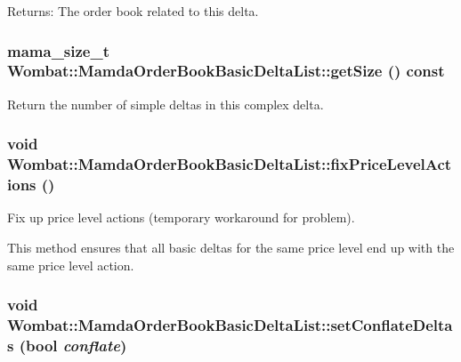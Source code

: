\begin{Desc}
\item[Returns:]The order book related to this delta. \end{Desc}
\hypertarget{classWombat_1_1MamdaOrderBookBasicDeltaList_1fe708dd0e109903a4ab216e390b74ec}{
\subsubsection[getSize]{\setlength{\rightskip}{0pt plus 5cm}mama\_\-size\_\-t Wombat::Mamda\-Order\-Book\-Basic\-Delta\-List::get\-Size () const}}
\label{classWombat_1_1MamdaOrderBookBasicDeltaList_1fe708dd0e109903a4ab216e390b74ec}


Return the number of simple deltas in this complex delta. 

\hypertarget{classWombat_1_1MamdaOrderBookBasicDeltaList_04e7cdfa64d6a7318a6fc5b7a84bb195}{
\subsubsection[fixPriceLevelActions]{\setlength{\rightskip}{0pt plus 5cm}void Wombat::Mamda\-Order\-Book\-Basic\-Delta\-List::fix\-Price\-Level\-Actions ()}}
\label{classWombat_1_1MamdaOrderBookBasicDeltaList_04e7cdfa64d6a7318a6fc5b7a84bb195}


Fix up price level actions (temporary workaround for problem). 

This method ensures that all basic deltas for the same price level end up with the same price level action. \hypertarget{classWombat_1_1MamdaOrderBookBasicDeltaList_80b385b03cc90b5e5ef8e49813988fae}{
\subsubsection[setConflateDeltas]{\setlength{\rightskip}{0pt plus 5cm}void Wombat::Mamda\-Order\-Book\-Basic\-Delta\-List::set\-Conflate\-Deltas (bool {\em conflate})}}
\label{classWombat_1_1MamdaOrderBookBasicDeltaList_80b385b03cc90b5e5ef8e49813988fae}


